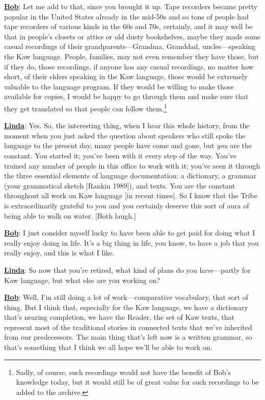 \documentclass[output=paper]{LSP/langsci}
\begin{document}
\textbf{\underline{Bob}}: Let me add to that, since you brought it up. Tape recorders became pretty popular in the United States already in the mid-50s and so tons of people had tape recorders of various kinds in the 60s and 70s, certainly, and it may well be that in people's closets or attics or old dusty bookshelves, maybe they made some casual recordings of their grandparents---Grandma, Granddad, uncles---speaking the Kaw language. People, families, may not even remember they have those, but if they do, those recordings, if anyone has any casual recordings, no matter how short, of their elders speaking in the Kaw language, those would be extremely valuable to the language program. If they would be willing to make those available for copies, I would be happy to go through them and make sure that they get translated so that people can follow them.\footnote{Sadly, of course, such recordings would not have the benefit of Bob's knowledge today, but it would still be of great value for such recordings to be added to the archive.}

\textbf{\underline{Linda}}: Yes. So, the interesting thing, when I hear this whole history, from the moment when you just asked the question about speakers who still spoke the language to the present day, many people have come and gone, but \textit{you} are the constant. You started it; you've been with it every step of the way. You've trained any number of people in this office to work with it; you've seen it through the three essential elements of language documentation: a dictionary, a grammar (your grammatical sketch [Rankin 1989]), and texts. You are the constant throughout all work on Kaw language [in recent times]. So I know that the Tribe is extraordinarily grateful to you and you certainly deserve this sort of aura of being able to walk on water. [Both laugh.]

\textbf{\underline{Bob}}: I just consider myself lucky to have been able to get paid for doing what I really enjoy doing in life. It's a big thing in life, you know, to have a job that you really enjoy, and this is what I like.

\textbf{\underline{Linda}}: So now that you're retired, what kind of plans do you have---partly for Kaw language, but what else are you working on?

\textbf{\underline{Bob}}: Well, I'm still doing a lot of work---comparative vocabulary, that sort of thing. But I think that, especially for the Kaw language, we have a dictionary that's nearing completion, we have the Reader, the set of Kaw texts, that represent most of the traditional stories in connected texts that we've inherited from our predecessors. The main thing that's left now is a written grammar, so that's something that I think we all hope we'll be able to work on.
\end{document}
